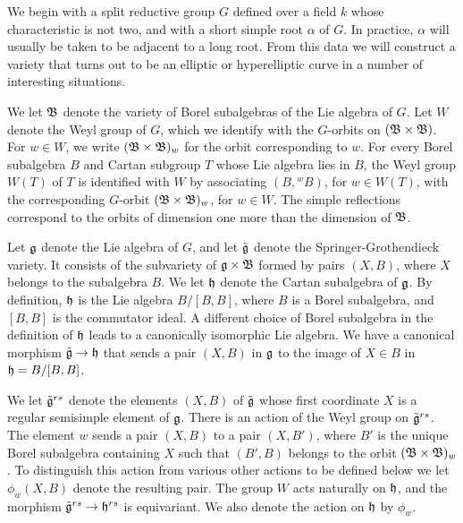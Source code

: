 We begin with a split reductive group $G$ defined over a
field $k$ whose characteristic is not two, and 
with a short simple root $\alpha$ of $G$.
In practice, $\alpha$ will usually be taken to be adjacent to a long root.
From this data we will construct a variety that turns
out to be an elliptic
or  hyperelliptic curve in a number of interesting situations.

We let ${\frak B}$ denote the variety of Borel subalgebras of the
Lie algebra of $G$.  Let $W$ denote
the Weyl group of $G$, which we identify with the $G$-orbits on
$({\frak B}\times {\frak B})$.   For $w\in W$, we write $({\frak B}\times {\frak B})_w$ for the
orbit corresponding to $w$.  
For every Borel subalgebra $B$ and Cartan subgroup $T$ whose Lie algebra
lies in $B$,
the Weyl group $W(T)$ of $T$ is identified with $W$ by
associating $(B,{}^w\! B)$, for $w\in W(T)$, with the 
corresponding $G$-orbit $({\frak B}\times{\frak B})_w$, for $w\in W$.
   The simple reflections correspond to the
orbits of dimension one more than the dimension of ${\frak B}$.

Let ${\frak g}$ denote the Lie algebra of $G$, and let $\tilde{{\frak g}}$ denote
the Springer-Grothendieck variety.  It consists of the subvariety
of ${\frak g}\times {\frak B}$ formed by pairs $(X,B)$, where $X$ belongs to the
subalgebra $B$.  We let ${\frak h}$ denote the Cartan subalgebra of ${\frak g}$.
By definition, ${\frak h}$ is the Lie algebra $B/[B,B]$, where $B$ is a Borel
subalgebra, and $[B,B]$ is the commutator ideal.  
A different choice of Borel subalgebra in the definition of ${\frak h}$ leads
to a canonically isomorphic Lie algebra. 
We have a canonical morphism $\tilde {{\frak g}}\to {\frak h}$ that sends a pair $(X,B)$ in ${\frak g}$
to the image of $X\in B$ in ${\frak h}=B/[B,B]$.

We let $\tilde{{\frak g}}^{rs}$ denote the elements $(X,B)$ of $\tilde{{\frak g}}$ whose
first coordinate $X$ is a regular semisimple element of ${\frak g}$.
There is an action of the Weyl group on $\tilde{{\frak g}}^{rs}$.  The element
$w$ sends a pair $(X,B)$ to a pair $(X,B')$, where $B'$ is the unique
Borel subalgebra containing $X$ such that $(B',B)$ belongs to the
orbit $({\frak B}\times{\frak B})_w$.  To distinguish
this action from various other actions to be defined below we let
$\phi_w(X,B)$ denote the resulting pair.  The group $W$ acts naturally
on ${\frak h}$, and the morphism $\tilde{{\frak g}}^{rs}\to{\frak h}^{rs}$ is equivariant.  
We also
denote the action on ${\frak h}$ by $\phi_w$.

